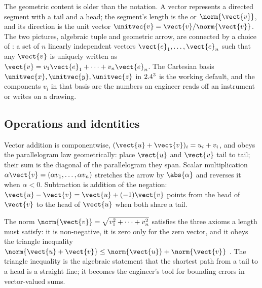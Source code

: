 The geometric content is older than the notation. A vector represents
a directed segment with a tail and a head; the segment's length is the
 or  $\norm{\vect{v}}$, and its
direction is the unit vector $\unitvec{v} = \vect{v} / \norm{\vect{v}}$.
The two pictures, algebraic tuple and geometric arrow, are connected
by a choice of : a set of $n$ linearly independent
vectors $\vect{e}_{1}, \ldots, \vect{e}_{n}$ such that any $\vect{v}$
is uniquely written as
$\vect{v} = v_{1}\vect{e}_{1} + \cdots + v_{n}\vect{e}_{n}$.
The Cartesian basis $\unitvec{x}, \unitvec{y}, \unitvec{z}$ in $2.4^{3}$
is the working default, and the components $v_{i}$ in that basis are
the numbers an engineer reads off an instrument or writes on a drawing.

\subsection{Operations and identities}

Vector addition is componentwise, $(\vect{u} + \vect{v})_{i} = u_{i} +
v_{i}$, and obeys the parallelogram law geometrically: place
$\vect{u}$ and $\vect{v}$ tail to tail; their sum is the diagonal of
the parallelogram they span. Scalar multiplication
$\alpha \vect{v} = (\alpha v_{1}, \ldots, \alpha v_{n})$ stretches
the arrow by $\abs{\alpha}$ and reverses it when $\alpha < 0$.
Subtraction is addition of the negation: $\vect{u} - \vect{v} =
\vect{u} + (-1)\vect{v}$ points from the head of $\vect{v}$ to the
head of $\vect{u}$ when both share a tail.

The norm $\norm{\vect{v}} = \sqrt{v_{1}^{2} + \cdots + v_{n}^{2}}$
satisfies the three axioms a length must satisfy: it is non-negative,
it is zero only for the zero vector, and it obeys the triangle
inequality $\norm{\vect{u} + \vect{v}} \leq \norm{\vect{u}} +
\norm{\vect{v}}$ \cite{text:strang2016}. The triangle inequality is
the algebraic statement that the shortest path from a tail to a head
is a straight line; it becomes the engineer's tool for bounding
errors in vector-valued sums.

